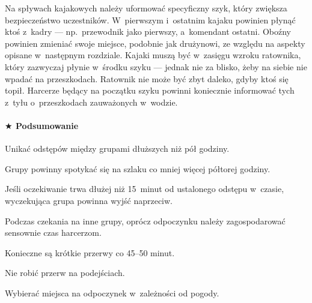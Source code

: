\documentclass[a5paper,10pt,titlepage,twoside]{article}
\newcommand*{\thecheckbox}{\hss$\Box$} %
\newenvironment*{checklist}
{\list{}{%
\renewcommand*{\makelabel}[1]{\thecheckbox}}}
{\endlist}
\begin{document}
Na spływach kajakowych należy uformować specyficzny szyk, który zwiększa bezpieczeństwo uczestników. W~pierwszym i~ostatnim kajaku powinien płynąć ktoś z~kadry --- np.~przewodnik jako pierwszy, a~komendant ostatni. Oboźny powinien zmieniać swoje miejsce, podobnie jak drużynowi, ze względu na aspekty opisane w~następnym rozdziale. Kajaki muszą być w~zasięgu wzroku ratownika, który zazwyczaj płynie w~środku szyku --- jednak nie za blisko, żeby na siebie nie wpadać na przeszkodach. Ratownik nie może być zbyt daleko, gdyby ktoś się topił. Harcerze będący na początku szyku powinni koniecznie informować tych z~tyłu o~przeszkodach zauważonych w~wodzie.
\paragraph{$\bigstar$ Podsumowanie}
\begin{checklist}
\item Unikać odstępów między grupami dłuższych niż pół godziny.
\item Grupy powinny spotykać się na szlaku co mniej więcej półtorej godziny.
\item Jeśli oczekiwanie trwa dłużej niż 15~minut od ustalonego odstępu w~czasie, wyczekująca grupa powinna wyjść naprzeciw.
\item Podczas czekania na inne grupy, oprócz odpoczynku należy zagospodarować sensownie czas harcerzom.
\item Konieczne są krótkie przerwy co 45--50 minut.
\item Nie robić przerw na podejściach.
\item Wybierać miejsca na odpoczynek w~zależności od pogody.
\end{checklist}
\end{document}
